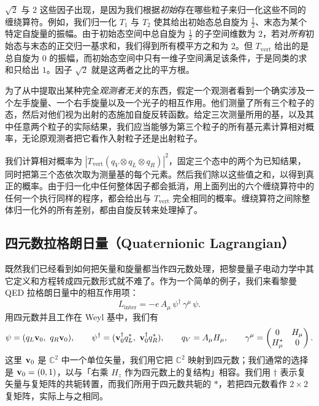 $\sqrt2$ 与 $2$ 这些因子出现，是因为我们根据\emph{初始}存在哪些粒子来归一化这些不同的缠绕算符。例如，我们归一化 $T_1$ 与 $T_2$ 使其给出初始态总自旋为 $\tfrac12$、末态为某个特定自旋量的振幅。由于初始态空间中总自旋为 $\tfrac12$ 的子空间维数为 $2$，若对\emph{所有}初始态与末态的正交归一基求和，我们得到所有模平方之和为 $2$。但 $T_{\mathrm{vert}}$ 给出的是总自旋为 $0$ 的振幅，而初始态空间中只有一维子空间满足该条件，于是同类的求和只给出 $1$。因子 $\sqrt2$ 就是这两者之比的平方根。

为了从中提取出某种完全\emph{观测者无关}的东西，假定一个观测者看到一个确实涉及一个左手旋量、一个右手旋量以及一个光子的相互作用。他们测量了所有三个粒子的态，然后对他们视为出射的态施加自旋反转函数。给定三次测量所用的基，以及其中任意两个粒子的实际结果，我们应当能够为第三个粒子的所有基元素计算相对概率，无论原观测者把它看作入射粒子还是出射粒子。

我们计算相对概率为 $|T_{\mathrm{vert}}(q_V\otimes q_L\otimes q_R)|^{2}$，固定三个态中的两个为已知结果，同时把第三个态依次取为测量基的每个元素。然后我们除以这些值之和，以得到真正的概率。由于归一化中任何整体因子都会抵消，用上面列出的六个缠绕算符中的任何一个执行同样的程序，都会给出与 $T_{\mathrm{vert}}$ 完全相同的概率。缠绕算符之间除整体归一化外的所有差别，都由自旋反转来处理掉了。

\subsection{四元数拉格朗日量（Quaternionic Lagrangian）}

既然我们已经看到如何把矢量和旋量都当作四元数处理，把黎曼量子电动力学中其它定义和方程转成四元数形式就不难了。作为一个简单的例子，我们来看黎曼 QED 拉格朗日量中的相互作用项：
\begin{equation*}
L_{\mathrm{inter}}=-e\,A_\mu\,\psi^\dagger\,\gamma^\mu\,\psi .
\end{equation*}
用四元数并且工作在 Weyl 基中，我们有
\begin{equation*}
\psi=(q_L\mathbf{v}_0,\ q_R\mathbf{v}_0),\qquad
\psi^\dagger=(\mathbf{v}_0^\dagger q_L^*,\ \mathbf{v}_0^\dagger q_R^*),\qquad
q_V=A_\mu H_\mu,\qquad
\gamma^\mu=\begin{pmatrix}0&H_\mu\\ H_\mu^*&0\end{pmatrix}.
\end{equation*}
这里 $\mathbf{v}_0$ 是 $\mathbb{C}^{2}$ 中一个单位矢量，我们用它把 $\mathbb{C}^{2}$ 映射到四元数；我们通常的选择是 $\mathbf{v}_0=(0,1)$，以与「右乘 $H_z$ 作为四元数上的复结构」相容。我们用 $\dagger$ 表示复矢量与复矩阵的共轭转置，而我们所用于四元数共轭的 $*$，若把四元数看作 $2\times2$ 复矩阵，实际上与之相同。

